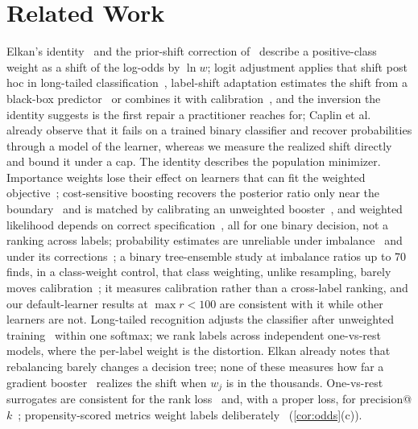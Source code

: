 \documentclass[runningheads]{llncs}
\begin{document}
\section{Related Work}
\label{sec:related}

Elkan's identity~\cite{Elkan2001} and the prior-shift correction of~\cite{Saerens2002} describe a positive-class weight as a shift of the log-odds by $\ln w$; logit adjustment applies that shift post hoc in long-tailed classification~\cite{Menon2021LogitAdjust}, label-shift adaptation estimates the shift from a black-box predictor~\cite{Lipton2018LabelShift} or combines it with calibration~\cite{Alexandari2020MLLS}, and the inversion the identity suggests is the first repair a practitioner reaches for; Caplin et al.~\cite{Caplin2022ClassWeights} already observe that it fails on a trained binary classifier and recover probabilities through a model of the learner, whereas we measure the realized shift directly and bound it under a cap. The identity describes the population minimizer. Importance weights lose their effect on learners that can fit the weighted objective~\cite{Byrd2019}; cost-sensitive boosting recovers the posterior ratio only near the boundary~\cite{MasnadiShirazi2011CSBoost} and is matched by calibrating an unweighted booster~\cite{Nikolaou2016CSBoost}, and weighted likelihood depends on correct specification~\cite{Dmochowski2010CostSensitive}, all for one binary decision, not a ranking across labels; probability estimates are unreliable under imbalance~\cite{Wallace2012} and under its corrections~\cite{VandenGoorbergh2022}; a binary tree-ensemble study at imbalance ratios up to 70 finds, in a class-weight control, that class weighting, unlike resampling, barely moves calibration~\cite{Liu2026Resampling}; it measures calibration rather than a cross-label ranking, and our default-learner results at $\max r<100$ are consistent with it while other learners are not. Long-tailed recognition adjusts the classifier after unweighted training~\cite{Kang2020Decoupling,Menon2021LogitAdjust} within one softmax; we rank labels across independent one-vs-rest models, where the per-label weight is the distortion. Elkan already notes that rebalancing barely changes a decision tree; none of these measures how far a gradient booster~\cite{Friedman2001GBM} realizes the shift when $w_j$ is in the thousands. One-vs-rest surrogates are consistent for the rank loss~\cite{Dembczynski2012Univariate} and, with a proper loss, for precision@$k$~\cite{Menon2019Reductions,Wydmuch2018PLT}; propensity-scored metrics weight labels deliberately~\cite{Jain2016XMLLoss} (\cref{cor:odds}(c)).
\end{document}
